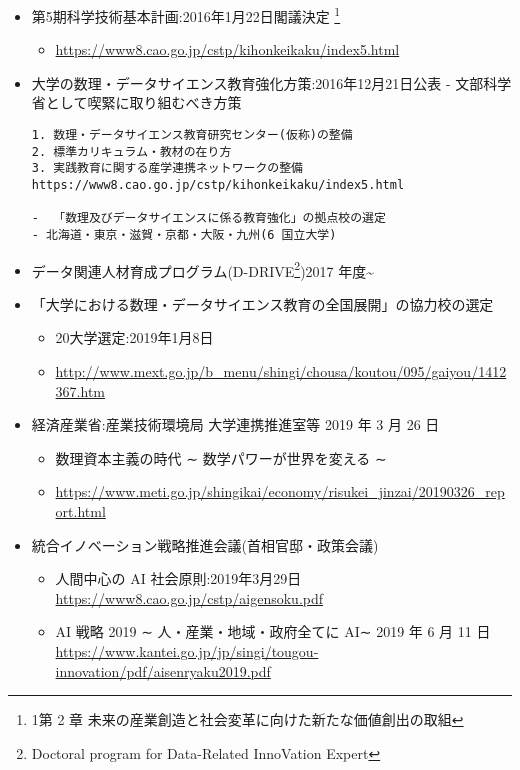 \documentclass[
]{book}
\providecommand{\tightlist}{%
  \setlength{\itemsep}{0pt}\setlength{\parskip}{0pt}}
\theoremstyle{definition}
\theoremstyle{definition}
\theoremstyle{definition}
\theoremstyle{definition}
\theoremstyle{remark}
\begin{document}
\begin{itemize}
\item
  第5期科学技術基本計画:2016年1月22日閣議決定 \footnote{1第 2 章 未来の産業創造と社会変革に向けた新たな価値創出の取組}

  \begin{itemize}
  \tightlist
  \item
    \url{https://www8.cao.go.jp/cstp/kihonkeikaku/index5.html}
  \end{itemize}
\item
  大学の数理・データサイエンス教育強化方策:2016年12月21日公表
  - 文部科学省として喫緊に取り組むべき方策

\begin{verbatim}
1. 数理・データサイエンス教育研究センター(仮称)の整備
2. 標準カリキュラム・教材の在り方
3. 実践教育に関する産学連携ネットワークの整備         
https://www8.cao.go.jp/cstp/kihonkeikaku/index5.html

-  「数理及びデータサイエンスに係る教育強化」の拠点校の選定 
- 北海道・東京・滋賀・京都・大阪・九州(6 国立大学)
\end{verbatim}
\item
  データ関連人材育成プログラム(D-DRIVE\footnote{Doctoral program for Data-Related InnoVation Expert})2017 年度\textasciitilde{}
\item
  「大学における数理・データサイエンス教育の全国展開」の協力校の選定

  \begin{itemize}
  \tightlist
  \item
    20大学選定:2019年1月8日
  \item
    \url{http://www.mext.go.jp/b_menu/shingi/chousa/koutou/095/gaiyou/1412367.htm}
  \end{itemize}
\item
  経済産業省:産業技術環境局 大学連携推進室等 2019 年 3 月 26 日

  \begin{itemize}
  \item
    数理資本主義の時代 ∼ 数学パワーが世界を変える ∼
  \item
    \url{https://www.meti.go.jp/shingikai/economy/risukei_jinzai/20190326_report.html}
  \end{itemize}
\item
  統合イノベーション戦略推進会議(首相官邸・政策会議)

  \begin{itemize}
  \tightlist
  \item
    人間中心の AI 社会原則:2019年3月29日
    \url{https://www8.cao.go.jp/cstp/aigensoku.pdf}
  \item
    AI 戦略 2019 ∼ 人・産業・地域・政府全てに AI∼ 2019 年 6 月 11 日 \url{https://www.kantei.go.jp/jp/singi/tougou-innovation/pdf/aisenryaku2019.pdf}
  \end{itemize}
\end{itemize}
\end{document}
